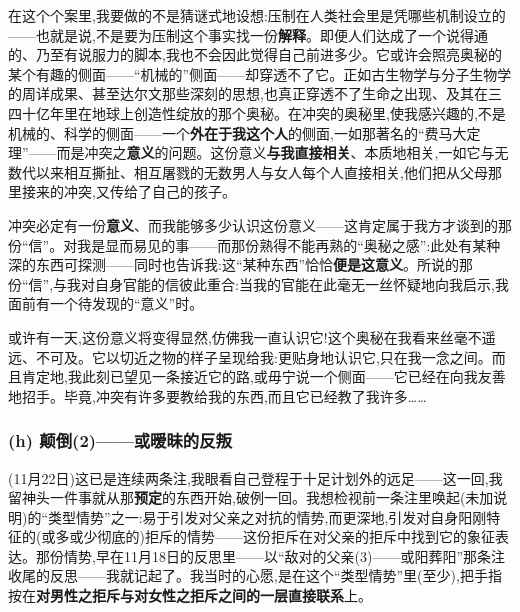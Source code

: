 在这个个案里,我要做的不是猜谜式地设想:压制在人类社会里是凭哪些机制设立的\dmark{}——也就是说,不是要为压制这个事实找一份\textbf{解释}。即便人们达成了一个说得通的、乃至有说服力的脚本,我也不会因此觉得自己前进多少。它或许会照亮奥秘的某个有趣的侧面——“机械的”侧面——却穿透不了它。正如古生物学与分子生物学的周详成果、甚至达尔文那些深刻的思想,也真正穿透不了生命之出现、及其在三四十亿年里在地球上创造性绽放的那个奥秘。在冲突的奥秘里,使我感兴趣的,不是机械的、科学的侧面——一个\textbf{外在于我这个人}的侧面,一如那著名的“费马大定理”——而是冲突之\textbf{意义}的问题。这份意义\textbf{与我直接相关}、本质地相关,一如它与无数代以来相互撕扯、相互屠戮的无数男人与女人每个人直接相关,他们把从父母那里接来的冲突,又传给了自己的孩子。

冲突必定有一份\textbf{意义}、而我能够多少认识这份意义——这肯定属于我方才谈到的那份“信”。对我是显而易见的事——而那份熟得不能再熟的“奥秘之感”:此处有某种深的东西可探测——同时也告诉我:这“某种东西”恰恰\textbf{便是这意义}。所说的那份“信”,与我对自身官能的信彼此重合:当我的官能在此毫无一丝怀疑地向我启示,我面前有一个待发现的“意义”时。

或许有一天,这份意义将变得显然,仿佛我一直认识它!这个奥秘在我看来丝毫不遥远、不可及。它以切近之物的样子呈现给我:更贴身地认识它,只在我一念之间。而且肯定地,我此刻已望见一条接近它的路,或毋宁说一个侧面——它已经在向我友善地招手。毕竟,冲突有许多要教给我的东西,而且它已经教了我许多……

\subsubsection*{(h) 颠倒(2)——或暧昧的反叛}
\label{ch18:local:h42}

\label{ch18:local:n38}

(11月22日)这已是连续两条注,我眼看自己登程于十足计划外的远足——这一回\dmark{},我留神头一件事就从那\textbf{预定}的东西开始,破例一回。我想检视前一条注里唤起(未加说明)的“类型情势”之一:易于引发对父亲之对抗的情势,而更深地,引发对自身阳刚特征的(或多或少彻底的)拒斥的情势——这份拒斥在对父亲的拒斥中找到它的象征表达。那份情势,早在11月18日的反思里——以“敌对的父亲(3)——或阳葬阳”那条注收尾的反思——我就记起了。我当时的心愿,是在这个“类型情势”里(至少),把手指按在\textbf{对男性之拒斥与对女性之拒斥之间的一层直接联系}上。

